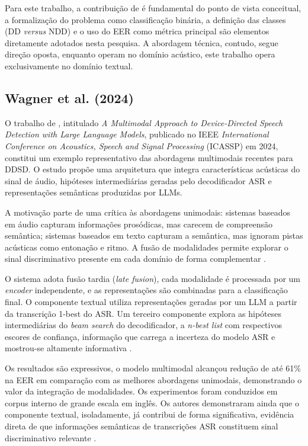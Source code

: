 \documentclass[
    12pt,                %
    openright,           %
    oneside,             %
    a4paper,             %
    english,             %
    brazil               %
]{abntex2}
\begin{document}
Para este trabalho, a contribuição de  é fundamental do ponto de vista conceitual, a formalização do problema como classificação binária, a definição das classes (DD \textit{versus} NDD) e o uso do EER como métrica principal são elementos diretamente adotados nesta pesquisa. A abordagem técnica, contudo, segue direção oposta, enquanto  operam no domínio acústico, este trabalho opera exclusivamente no domínio textual.


\subsection{Wagner et al. (2024)}

O trabalho de , intitulado \textit{A Multimodal Approach to Device-Directed Speech Detection with Large Language Models}, publicado no IEEE \textit{International Conference on Acoustics, Speech and Signal Processing} (ICASSP) em 2024, constitui um exemplo representativo das abordagens multimodais recentes para DDSD. O estudo propõe uma arquitetura que integra características acústicas do sinal de áudio, hipóteses intermediárias geradas pelo decodificador ASR e representações semânticas produzidas por LLMs.

A motivação parte de uma crítica às abordagens unimodais: sistemas baseados
em áudio capturam informações prosódicas, mas carecem de compreensão
semântica; sistemas baseados em texto capturam a semântica, mas ignoram
pistas acústicas como entonação e ritmo. A fusão de modalidades permite
explorar o sinal discriminativo presente em cada domínio de forma
complementar \cite{Wagner2024}.

O sistema adota fusão tardia (\textit{late fusion}), cada modalidade é
processada por um \textit{encoder} independente, e as representações são
combinadas para a classificação final. O componente textual utiliza
representações geradas por um LLM a partir da transcrição 1-best do ASR.
Um terceiro componente explora as hipóteses intermediárias do
\textit{beam search} do decodificador, a \textit{n-best list} com
respectivos escores de confiança, informação que carrega a incerteza
do modelo ASR e mostrou-se altamente informativa \cite{Wagner2024}.

Os resultados são expressivos, o modelo multimodal alcançou redução de
até 61\% na EER em comparação com as melhores abordagens unimodais,
demonstrando o valor da integração de modalidades. Os experimentos foram
conduzidos em corpus interno de grande escala em inglês. Os autores
demonstraram ainda que o componente textual, isoladamente, já contribui
de forma significativa, evidência direta de que informações semânticas
de transcrições ASR constituem sinal discriminativo relevante
\cite{Wagner2024}.
\end{document}

